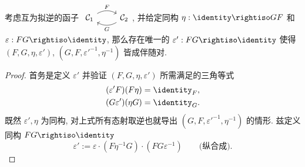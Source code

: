 \begin{theorem}[伴随等价] \label{prop:adjoint-equivalence}
	考虑互为拟逆的函子
	$\begin{tikzcd}
		\mathcal{C}_1 \arrow[r, bend left, "F"] & \mathcal{C}_2 \arrow[l, bend left, "G"]
	\end{tikzcd}$, 并给定同构 $\eta: \identity \rightiso GF$ 和 $\varepsilon: FG \rightiso \identity$, 那么存在唯一的 $\varepsilon': FG \rightiso \identity$ 使得 $(F, G, \eta, \varepsilon')$, $(G, F, \varepsilon'^{-1}, \eta^{-1})$ 皆成伴随对.
\end{theorem}
\begin{proof}
	首务是定义 $\varepsilon'$ 并验证 $(F, G, \eta, \varepsilon')$ 所需满足的三角等式
	\begin{align}
		\label{eqn:adj-zigzag-1} (\varepsilon' F)(F\eta) & = \identity_F, \\
		\label{eqn:adj-zigzag-2} (G\varepsilon')(\eta G) & = \identity_G.
	\end{align}
	既然 $\varepsilon', \eta$ 为同构, 对上式所有态射取逆也就导出 $(G, F, \varepsilon'^{-1}, \eta^{-1})$ 的情形. 兹定义同构 $FG \rightiso \identity$
	\[ \varepsilon' := \varepsilon \cdot (F\eta^{-1}G) \cdot (FG\varepsilon^{-1}) \qquad \text{(纵合成)}. \]


\end{proof}
